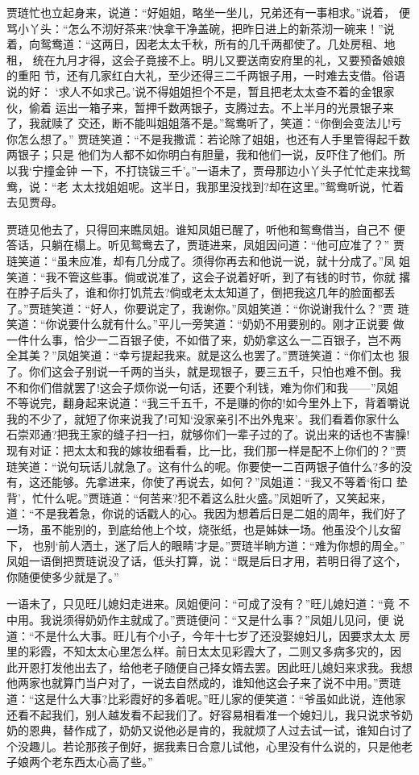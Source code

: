 贾琏忙也立起身来，说道：“好姐姐，略坐一坐儿，兄弟还有一事相求。”说着，
便骂小丫头：“怎么不沏好茶来?快拿干净盖碗，把昨日进上的新茶沏一碗来！”说
着，向鸳鸯道：“这两日，因老太太千秋，所有的几千两都使了。几处房租、地租，
统在九月才得，这会子竟接不上。明儿又要送南安府里的礼，又要预备娘娘的重阳
节，还有几家红白大礼，至少还得三二千两银子用，一时难去支借。俗语说的好：
‘求人不如求己。’说不得姐姐担个不是，暂且把老太太查不着的金银家伙，偷着
运出一箱子来，暂押千数两银子，支腾过去。不上半月的光景银子来了，我就赎了
交还，断不能叫姐姐落不是。”鸳鸯听了，笑道：“你倒会变法儿!亏你怎么想了。”
贾琏笑道：“不是我撒谎：若论除了姐姐，也还有人手里管得起千数两银子；只是
他们为人都不如你明白有胆量，我和他们一说，反吓住了他们。所以我‘宁撞金钟
一下，不打铙钹三千’。”一语未了，贾母那边小丫头子忙忙走来找鸳鸯，说：“老
太太找姐姐呢。这半日，我那里没找到?却在这里。”鸳鸯听说，忙着去见贾母。

贾琏见他去了，只得回来瞧凤姐。谁知凤姐已醒了，听他和鸳鸯借当，自己不
便答话，只躺在榻上。听见鸳鸯去了，贾琏进来，凤姐因问道：“他可应准了？”
贾琏笑道：“虽未应准，却有几分成了。须得你再去和他说一说，就十分成了。”凤
姐笑道：“我不管这些事。倘或说准了，这会子说着好听，到了有钱的时节，你就
撂在脖子后头了，谁和你打饥荒去?倘或老太太知道了，倒把我这几年的脸面都丢
了。”贾琏笑道：“好人，你要说定了，我谢你。”凤姐笑道：“你说谢我什么？”贾
琏笑道：“你说要什么就有什么。”平儿一旁笑道：“奶奶不用要别的。刚才正说要
做一件什么事，恰少一二百银子使，不如借了来，奶奶拿这么一二百银子，岂不两
全其美？”凤姐笑道：“幸亏提起我来。就是这么也罢了。”贾琏笑道：“你们太也
狠了。你们这会子别说一千两的当头，就是现银子，要三五千，只怕也难不倒。我
不和你们借就罢了!这会子烦你说一句话，还要个利钱，难为你们和我——”凤姐
不等说完，翻身起来说道：“我三千五千，不是赚的你的!如今里外上下，背着嚼说
我的不少了，就短了你来说我了!可知‘没家亲引不出外鬼来’。我们看着你家什么
石崇邓通?把我王家的缝子扫一扫，就够你们一辈子过的了。说出来的话也不害臊!
现有对证：把太太和我的嫁妆细看看，比一比，我们那一样是配不上你们的？”贾
琏笑道：“说句玩话儿就急了。这有什么的呢。你要使一二百两银子值什么?多的没
有，这还能够。先拿进来，你使了再说去，如何？”凤姐道：“我又不等着‘衔口
垫背’，忙什么呢。”贾琏道：“何苦来?犯不着这么肚火盛。”凤姐听了，又笑起来，
道：“不是我着急，你说的话戳人的心。我因为想着后日是二姐的周年，我们好了
一场，虽不能别的，到底给他上个坟，烧张纸，也是姊妹一场。他虽没个儿女留下，
也别‘前人洒土，迷了后人的眼睛’才是。”贾琏半晌方道：“难为你想的周全。”
凤姐一语倒把贾琏说没了话，低头打算，说：“既是后日才用，若明日得了这个，
你随便使多少就是了。”

一语未了，只见旺儿媳妇走进来。凤姐便问：“可成了没有？”旺儿媳妇道：“竟
不中用。我说须得奶奶作主就成了。”贾琏便问：“又是什么事？”凤姐儿见问，便
说道：“不是什么大事。旺儿有个小子，今年十七岁了还没娶媳妇儿，因要求太太
房里的彩霞，不知太太心里怎么样。前日太太见彩霞大了，二则又多病多灾的，因
此开恩打发他出去了，给他老子随便自己择女婿去罢。因此旺儿媳妇来求我。我想
他两家也就算门当户对了，一说去自然成的，谁知他这会子来了说不中用。”贾琏
道：“这是什么大事?比彩霞好的多着呢。”旺儿家的便笑道：“爷虽如此说，连他家
还看不起我们，别人越发看不起我们了。好容易相看准一个媳妇儿，我只说求爷奶
奶的恩典，替作成了，奶奶又说他必是肯的，我就烦了人过去试一试，谁知白讨了
个没趣儿。若论那孩子倒好，据我素日合意儿试他，心里没有什么说的，只是他老
子娘两个老东西太心高了些。”

